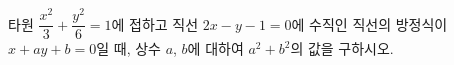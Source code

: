 타원 $\dfrac{x^2}{3}+\dfrac{y^2}{6}=1$에 접하고 직선 $2x-y-1=0$에 수직인 직선의 방정식이 $x+ay+b=0$일 때, 상수 $a$, $b$에 대하여 $a^2+b^2$의 값을 구하시오.
